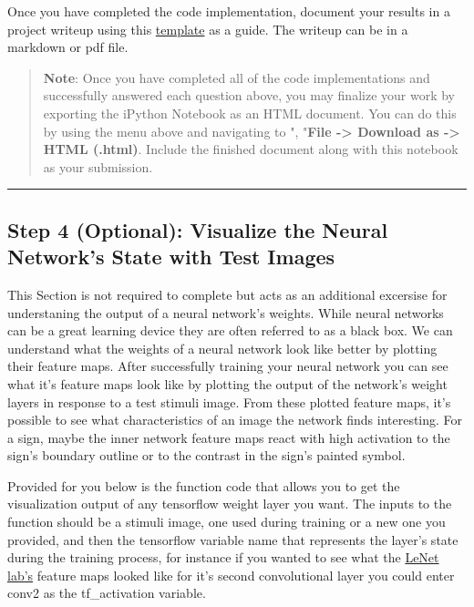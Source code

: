 \documentclass[11pt]{article}
\begin{document}
Once you have completed the code implementation, document your results
in a project writeup using this
\href{https://github.com/udacity/CarND-Traffic-Sign-Classifier-Project/blob/master/writeup_template.md}{template}
as a guide. The writeup can be in a markdown or pdf file.

    \begin{quote}
\textbf{Note}: Once you have completed all of the code implementations
and successfully answered each question above, you may finalize your
work by exporting the iPython Notebook as an HTML document. You can do
this by using the menu above and navigating to \n", "\textbf{File
-\textgreater{} Download as -\textgreater{} HTML (.html)}. Include the
finished document along with this notebook as your submission.
\end{quote}

    \begin{center}\rule{0.5\linewidth}{\linethickness}\end{center}

\subsection{Step 4 (Optional): Visualize the Neural Network's State with
Test
Images}\label{step-4-optional-visualize-the-neural-networks-state-with-test-images}

This Section is not required to complete but acts as an additional
excersise for understaning the output of a neural network's weights.
While neural networks can be a great learning device they are often
referred to as a black box. We can understand what the weights of a
neural network look like better by plotting their feature maps. After
successfully training your neural network you can see what it's feature
maps look like by plotting the output of the network's weight layers in
response to a test stimuli image. From these plotted feature maps, it's
possible to see what characteristics of an image the network finds
interesting. For a sign, maybe the inner network feature maps react with
high activation to the sign's boundary outline or to the contrast in the
sign's painted symbol.

Provided for you below is the function code that allows you to get the
visualization output of any tensorflow weight layer you want. The inputs
to the function should be a stimuli image, one used during training or a
new one you provided, and then the tensorflow variable name that
represents the layer's state during the training process, for instance
if you wanted to see what the
\href{https://classroom.udacity.com/nanodegrees/nd013/parts/fbf77062-5703-404e-b60c-95b78b2f3f9e/modules/6df7ae49-c61c-4bb2-a23e-6527e69209ec/lessons/601ae704-1035-4287-8b11-e2c2716217ad/concepts/d4aca031-508f-4e0b-b493-e7b706120f81}{LeNet
lab's} feature maps looked like for it's second convolutional layer you
could enter conv2 as the tf\_activation variable.
\end{document}
